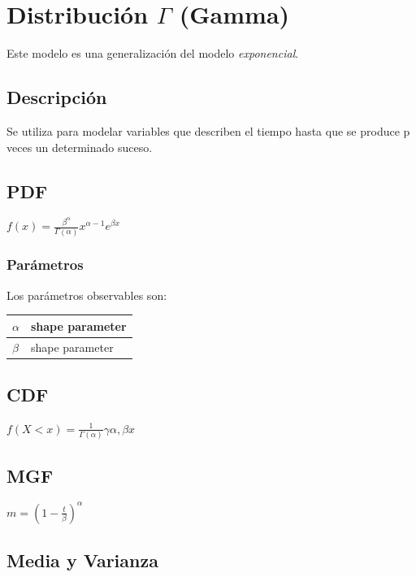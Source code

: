 \chapter{Distribución $ \Gamma $ (Gamma) }
Este modelo es una generalización del modelo \textit{exponencial}.

\section{Descripción}
Se utiliza para modelar  variables que describen el tiempo hasta que se produce p veces un determinado suceso. \cite{wiki:3}

\section{PDF}
\begin{center}
	$ f(x) = \frac{\beta^\alpha}{\Gamma(\alpha)} x^{\alpha - 1} e^{\beta x}$
\end{center}

\subsection{Parámetros}
Los parámetros observables son:

\begin{center}
	\begin{tabular} {| l | l |}
		\hline
		$\alpha$ & shape parameter\\ \hline
		$\beta$ & shape parameter\\ \hline		
	\end{tabular}
\end{center}

\section{CDF}
\begin{center}
	$ f(X < x) = \frac{1}{\Gamma(\alpha)} \gamma{\alpha, \beta x}$
\end{center}

\section{MGF}
\begin{center}
	$ m = (1 - \frac{t}{\beta})^{\alpha}$
\end{center}
\section{Media y Varianza}
